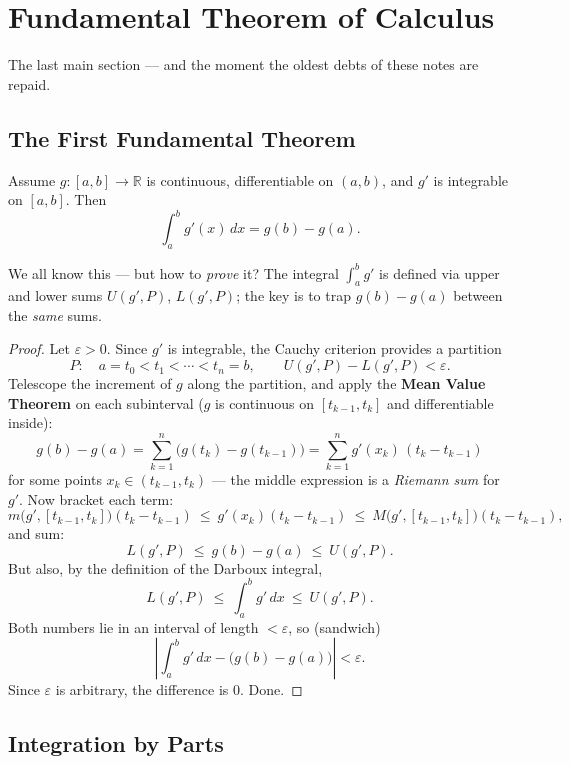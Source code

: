 \documentclass[11pt]{report}
\begin{document}
\section{Fundamental Theorem of Calculus}

The last main section --- and the moment the oldest debts of these notes are repaid.

\subsection{The First Fundamental Theorem}

\begin{thmbox}
Assume $g: [a,b] \to \mathbb{R}$ is continuous, differentiable on $(a,b)$, and $g'$ is integrable on $[a,b]$. Then
\[
\int_a^b g'(x)\,dx = g(b) - g(a).
\]
\end{thmbox}

We all know this --- but how to \emph{prove} it? The integral $\int_a^b g'$ is defined via upper and lower sums $U(g', P)$, $L(g', P)$; the key is to trap $g(b) - g(a)$ between the \emph{same} sums.

\begin{proof}
Let $\varepsilon > 0$. Since $g'$ is integrable, the Cauchy criterion provides a partition
\[
P: \quad a = t_0 < t_1 < \cdots < t_n = b, \qquad U(g', P) - L(g', P) < \varepsilon.
\]
Telescope the increment of $g$ along the partition, and apply the \textbf{Mean Value Theorem} on each subinterval ($g$ is continuous on $[t_{k-1}, t_k]$ and differentiable inside):
\[
g(b) - g(a) = \sum_{k=1}^n \bigl( g(t_k) - g(t_{k-1}) \bigr) = \sum_{k=1}^n g'(x_k)\,(t_k - t_{k-1})
\]
for some points $x_k \in (t_{k-1}, t_k)$ --- the middle expression is a \emph{Riemann sum} for $g'$. Now bracket each term:
\[
m\bigl(g', [t_{k-1},t_k]\bigr)(t_k - t_{k-1}) \ \leq\ g'(x_k)(t_k - t_{k-1}) \ \leq\ M\bigl(g', [t_{k-1},t_k]\bigr)(t_k - t_{k-1}),
\]
and sum:
\[
L(g', P) \ \leq\ g(b) - g(a) \ \leq\ U(g', P).
\]
But also, by the definition of the Darboux integral,
\[
L(g', P) \ \leq\ \int_a^b g'\,dx \ \leq\ U(g', P).
\]
Both numbers lie in an interval of length $< \varepsilon$, so (sandwich)
\[
\left| \int_a^b g'\,dx - \bigl( g(b) - g(a) \bigr) \right| < \varepsilon.
\]
Since $\varepsilon$ is arbitrary, the difference is $0$. Done.
\end{proof}

\subsection{Integration by Parts}
\end{document}
